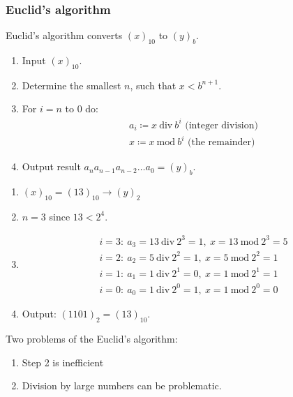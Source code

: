 \subsubsection{Euclid's algorithm}
Euclid's algorithm converts $(x)_{10}$ to $(y)_b$.
\begin{enumerate}%
    \item {
        Input $(x)_{10}$.
    }
    \item {
        Determine the smallest $n$, such that $x < b^{n+1}$.
    }
    \item {
        For $i=n$ to $0$ do:
        \begin{align*}
            &
            a_i \coloneqq x\ \mathrm{div}\ b^{i} \text{ (integer division)}
            \\&
            x \coloneqq x\ \mathrm{mod}\ b^{i} \text{ (the remainder)}
        \end{align*}
    }
    \item {
        Output result $a_n a_{n-1} a_{n-2} \dots a_0 = (y)_b$.
    }
\end{enumerate}

\begin{example}
    \begin{enumerate}
        \item {
            $(x)_{10} = (13)_{10} \to (y)_2$
        }
        \item {
            $n = 3$ since $13 < 2^4$.
        }
        \item {
            \begin{align*}
                &
                i = 3:\ a_3 = 13 \ \mathrm{div}\ 2^3 = 1,\
                x = 13 \ \mathrm{mod}\ 2^3 = 5
                \\&
                i = 2:\ a_2 = 5 \ \mathrm{div}\ 2^2 = 1,\
                x = 5 \ \mathrm{mod}\ 2^2 = 1
                \\&
                i = 1:\ a_1 = 1 \ \mathrm{div}\ 2^1 = 0,\
                x = 1 \ \mathrm{mod}\ 2^1 = 1
                \\&
                i = 0:\ a_0 = 1 \ \mathrm{div}\ 2^0 = 1,\
                x = 1 \ \mathrm{mod}\ 2^0 = 0
            \end{align*}
        }
        \item {
             Output: $(1101)_2 = (13)_{10}$.
        }
    \end{enumerate}
\end{example}
Two problems of the Euclid's algorithm:
\begin{enumerate}
    \item {
        Step 2 is inefficient
    }
    \item {
        Division by large numbers can be problematic.
    }
\end{enumerate}

